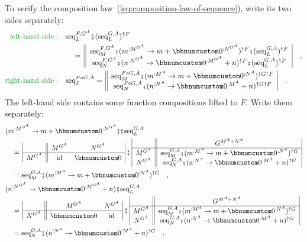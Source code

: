 To verify the composition law~(\ref{eq:composition-law-of-sequence}),
write its two sides separately:
\begin{align*}
{\color{greenunder}\text{left-hand side}:}\quad & \text{seq}_{L}^{F,G^{A}}\bef(\text{seq}_{L}^{G,A})^{\uparrow F}\\
 & \quad=\,\begin{array}{||c|}
\text{seq}_{M}^{F,G^{A}}\bef(m^{:M^{G^{A}}}\rightarrow m+\bbnum 0^{:N^{G^{A}}})^{\uparrow F}\bef(\text{seq}_{L}^{G,A})^{\uparrow F}\\
\text{seq}_{N}^{F,G^{A}}\bef(n^{:N^{G^{A}}}\rightarrow\bbnum 0^{:M^{G^{A}}}+n)^{\uparrow F}\bef(\text{seq}_{L}^{G,A})^{\uparrow F}
\end{array}\quad,\\
{\color{greenunder}\text{right-hand side}:}\quad & \text{seq}_{L}^{F\circ G,A}=\,\begin{array}{||c|}
\text{seq}_{M}^{F\circ G,A}\bef(m^{:M^{A}}\rightarrow m+\bbnum 0^{:N^{A}})^{\uparrow G\uparrow F}\\
\text{seq}_{N}^{F\circ G,A}\bef(n^{:N^{A}}\rightarrow\bbnum 0^{:M^{A}}+n)^{\uparrow G\uparrow F}
\end{array}\quad.
\end{align*}
The left-hand side contains some function compositions lifted to $F$.
Write them separately:
\begin{align*}
 & (m^{:M^{G^{A}}}\rightarrow m+\bbnum 0^{:N^{G^{A}}})\bef\text{seq}_{L}^{G,A}\\
 & \quad=\,\begin{array}{|c||cc|}
 & M^{G^{A}} & N^{G^{A}}\\
\hline M^{G^{A}} & \text{id} & \bbnum 0
\end{array}\,\bef\,\begin{array}{|c||c|}
 & G^{M^{A}+N^{A}}\\
\hline M^{G^{A}} & \text{seq}_{M}^{G,A}\bef(m^{:M^{A}}\rightarrow m+\bbnum 0^{:N^{A}})^{\uparrow G}\\
N^{G^{A}} & \text{seq}_{N}^{G,A}\bef(n^{:N^{A}}\rightarrow\bbnum 0^{:M^{A}}+n)^{\uparrow G}
\end{array}\\
 & \quad=\text{seq}_{M}^{G,A}\bef(m^{:M^{A}}\rightarrow m+\bbnum 0^{:N^{A}})^{\uparrow G}\quad,\\
 & (n^{:N^{G^{A}}}\rightarrow\bbnum 0^{:M^{G^{A}}}+n)\bef\text{seq}_{L}^{G,A}\\
 & \quad=\,\begin{array}{|c||cc|}
 & M^{G^{A}} & N^{G^{A}}\\
\hline N^{G^{A}} & \bbnum 0 & \text{id}
\end{array}\,\bef\,\begin{array}{|c||c|}
 & G^{M^{A}+N^{A}}\\
\hline M^{G^{A}} & \text{seq}_{M}^{G,A}\bef(m^{:M^{A}}\rightarrow m+\bbnum 0^{:N^{A}})^{\uparrow G}\\
N^{G^{A}} & \text{seq}_{N}^{G,A}\bef(n^{:N^{A}}\rightarrow\bbnum 0^{:M^{A}}+n)^{\uparrow G}
\end{array}\\
 & \quad=\text{seq}_{N}^{G,A}\bef(n^{:N^{A}}\rightarrow\bbnum 0^{:M^{A}}+n)^{\uparrow G}\quad.
\end{align*}
